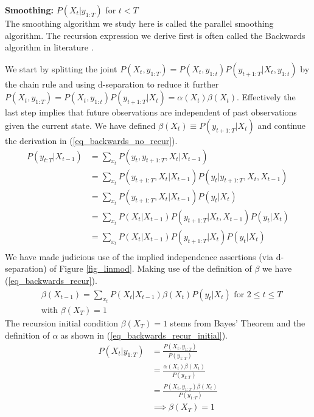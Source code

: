 \documentclass[../masters.tex]{subfiles}
\begin{document}
\textbf{Smoothing:} $P(X_t|y_{1:T})$ for $t<T$\\
The smoothing algorithm we study here is called the parallel smoothing algorithm. The recursion expression we derive first is often called the Backwards algorithm in literature \cite{murphy1}.

We start by splitting the joint $P(X_t, y_{1:T}) = P(X_t, y_{1:t})P(y_{t+1:T}|X_t,y_{1:t})$ by the chain rule and using d-separation to reduce it further $P(X_t, y_{1:T}) = P(X_t, y_{1:t})P(y_{t+1:T}|X_t) = \alpha(X_t)\beta(X_t)$. Effectively the last step implies that future observations are independent of past observations given the current state. We have defined $\beta(X_t)\equiv P(y_{t+1:T}|X_t)$ and continue the derivation in (\ref{eq_backwards_no_recur}).
\begin{equation}
\begin{aligned}
P(y_{t:T}|X_{t-1}) &= \sum_{x_t} P(y_t, y_{t+1:T}, X_t|X_{t-1}) \\
&= \sum_{x_t} P(y_{t+1:T}, X_t | X_{t-1})P(y_t| y_{t+1:T}, X_t, X_{t-1}) \\
&= \sum_{x_t} P(y_{t+1:T}, X_t | X_{t-1})P(y_t| X_t) \\
&= \sum_{x_t} P(X_t | X_{t-1})P(y_{t+1:T}| X_t,X_{t-1})P(y_t| X_t) \\
&= \sum_{x_t} P(X_t | X_{t-1})P(y_{t+1:T}| X_t)P(y_t| X_t) \\
\end{aligned}
\label{eq_backwards_no_recur}
\end{equation}
We have made judicious use of the implied independence assertions (via d-separation) of Figure \ref{fig_linmod}. Making use of the definition of $\beta$ we have (\ref{eq_backwards_recur}).
\begin{equation}
\begin{aligned}
&\beta(X_{t-1}) = \sum_{x_t} P(X_t | X_{t-1})\beta(X_t)P(y_t| X_t) \text{ for } 2 \leq t \leq T \\
&\text{with } \beta(X_T) = 1
\end{aligned}
\label{eq_backwards_recur}
\end{equation}
The recursion initial condition $\beta(X_T) = 1$ stems from Bayes' Theorem and the definition of $\alpha$ as shown in (\ref{eq_backwards_recur_initial}).
\begin{equation}
\begin{aligned}
P(X_t|y_{1:T}) &= \frac{P(X_t, y_{1:T})}{P(y_{1:T})} \\
&= \frac{\alpha(X_t)\beta(X_t)}{P(y_{1:T})}\\
&= \frac{P(X_t, y_{1:T})\beta(X_t)}{P(y_{1:T})}\\
&\implies \beta(X_T) = 1
\end{aligned}
\label{eq_backwards_recur_initial}
\end{equation}
\end{document}
